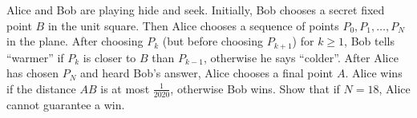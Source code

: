 Alice and Bob are playing hide and seek. Initially, Bob chooses a secret fixed point $B$ in the unit square. Then Alice chooses a sequence of points $P_0, P_1, \ldots, P_N$ in the plane. After choosing $P_k$ (but before choosing $P_{k+1}$) for $k \geq 1$, Bob tells ``warmer'' if $P_k$ is closer to $B$ than $P_{k-1}$, otherwise he says ``colder''. After Alice has chosen $P_N$ and heard Bob's answer, Alice chooses a final point $A$. Alice wins if the distance $AB$ is at most $\frac 1 {2020}$, otherwise Bob wins. Show that if $N=18$, Alice cannot guarantee a win.